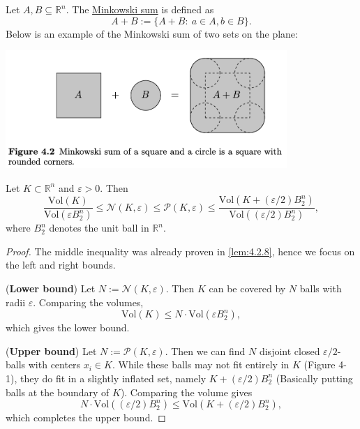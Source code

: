\begin{definition}
\label{def:4.2.9}
Let $A, B \subseteq \mathbb{R}^n$. The \underline{Minkowski sum} is defined as 
\[ A + B := \{ A + B: \ a \in A, b \in B \}. \]
Below is an example of the Minkowski sum of two sets on the plane:

\begin{center}
	\includegraphics[width=0.8\textwidth]{Chapter 4/fig4-2.png}
\end{center}
\end{definition}

\begin{proposition}
\label{prop:4.2.10}
Let $K \subset \mathbb{R}^n$ and $\varepsilon > 0$. Then
\[ \frac{\mathrm{Vol}(K)}{\mathrm{Vol}(\varepsilon B_2^n)} \leq \mathcal{N}(K, \varepsilon) 
\leq \mathcal{P}(K, \varepsilon) \leq 
\frac{\mathrm{Vol}(K + (\varepsilon / 2)B_2^n)}{\mathrm{Vol}((\varepsilon / 2)B_2^n)}, \]
where $B_2^n$ denotes the unit ball in $\mathbb{R}^n$. 
\end{proposition}

\begin{proof}
The middle inequality was already proven in \cref{lem:4.2.8}, hence we focus on the left and right bounds.

(\textbf{Lower bound}) Let $N := \mathcal{N}(K, \varepsilon)$. Then $K$ can be covered by $N$ balls with radii 
$\varepsilon$. Comparing the volumes,
\[ \mathrm{Vol}(K) \leq N \cdot \mathrm{Vol}(\varepsilon B_2^n), \]
which gives the lower bound.

(\textbf{Upper bound}) Let $N := \mathcal{P}(K, \varepsilon)$. Then we can find $N$ disjoint closed 
$\varepsilon / 2$-balls with centers $x_i \in K$. While these balls may not fit entirely in $K$ (Figure 4-1), 
they do fit in a slightly inflated set, namely $K + (\varepsilon / 2)B_2^n$ (Basically putting balls at the 
boundary of $K$). Comparing the volume gives 
\[ N \cdot \mathrm{Vol}((\varepsilon / 2)B_2^n) \leq \mathrm{Vol}(K + (\varepsilon / 2)B_2^n), \]
which completes the upper bound.
\end{proof}

